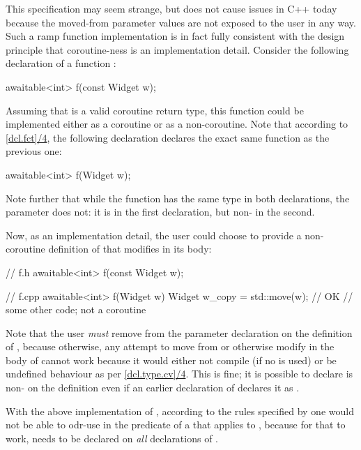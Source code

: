 This specification may seem strange, but does not cause issues in C++ today because the moved-from parameter values are not exposed to the user in any way. Such a ramp function implementation is in fact fully consistent with the design principle that coroutine-ness is an implementation detail. Consider the following declaration of a function :
\begin{codeblock}
awaitable<int> f(const Widget w);
\end{codeblock}
Assuming that  is a valid coroutine return type, this function could be  implemented either as a coroutine or as a non-coroutine. Note that according to \href{https://eel.is/c++draft/dcl.fct#4.sentence-2}{[dcl.fct]/4}, the following declaration declares the exact same function as the previous one:
\begin{codeblock}
awaitable<int> f(Widget w);
\end{codeblock}
Note further that while the function  has the same type in both declarations, the parameter  does not: it is  in the first declaration, but non- in the second.

Now, as an implementation detail, the user could choose to provide a non-coroutine definition of  that modifies  in its body:
\begin{codeblock}
// f.h
awaitable<int> f(const Widget w);

// f.cpp
awaitable<int> f(Widget w)
{
  Widget w_copy = std::move(w); // OK
  // some other code; not a coroutine
}
\end{codeblock}
Note that the user \emph{must} remove  from the parameter declaration on the definition of , because otherwise, any attempt to move from  or otherwise modify  in the body of  cannot work because it would either not compile (if no  is used) or be undefined behaviour as per \href{https://eel.is/c++draft/dcl.type.cv#4.sentence-1}{[dcl.type.cv]/4}. This is fine; it is possible to declare  is non- on the definition even if an earlier declaration of  declares it as .

With the above implementation of , according to the rules specified by \cite{P2900R8} one would not be able to odr-use  in the predicate of a  that applies to , because for that to work,  needs to be declared  on \emph{all} declarations of .

